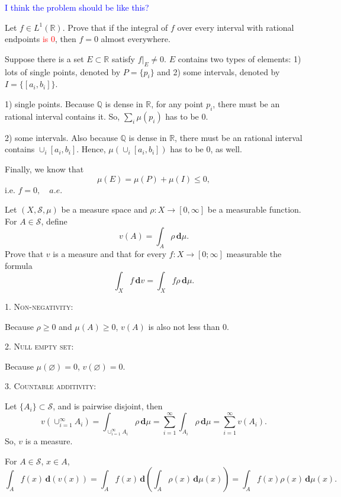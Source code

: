 \documentclass[12pt]{article}
\newenvironment{exercise}[1]{\begin{tcolorbox}[colback=black!15, colframe=black!80, breakable, title=#1]}{\end{tcolorbox}}
\newenvironment{solution}{\begin{tcolorbox}[colback=white, colframe=black!50, breakable, title=Solution. ]\setlength{\parskip}{0.8em}}{\end{tcolorbox}}
\newcommand{\der}{\,\mathbf{d}}
\begin{document}
    \begin{solution}
        \textcolor{blue}{I think the problem should be like this? }
        
        Let $f \in L^1(\mathbb{R})$. Prove that if the integral of $f$ over every interval with rational endpoints \textcolor{red}{is $0$}, then $f = 0$ almost everywhere. 
        
        Suppose there is a set $E\subset \mathbb{R}$ satisfy $f|_E\not=0$. $E$ contains two types of elements: 1) lots of single points, denoted by $P=\{p_i\}$ and 2) some intervals, denoted by $I=\{[a_i,b_i]\}$. 

        1) single points. Because $\mathbb{Q}$ is dense in $\mathbb{R}$, for any point $p_i$, there must be an rational interval contains it. So, $\sum_i\mu(p_i)$ has to be $0$. 

        2) some intervals. Also because $\mathbb{Q}$ is dense in $\mathbb{R}$, there must be an rational interval contains $\cup_i[a_i,b_i]$. Hence, $\mu(\cup_i[a_i,b_i])$ has to be $0$, as well. 

        Finally, we know that \[\mu(E)=\mu(P)+\mu(I)\leqslant0, \]
        i.e. $f=0,\quad a.e$. 
    \end{solution}

    \begin{exercise}{12}
        Let $(X, \mathscr{S}, \mu)$ be a measure space and $\rho : X \to [0, \infty]$ be a measurable function. For $A \in \mathscr{S}$, define
        \[
            v(A)=\int_A\rho\der \mu. 
        \]
        Prove that $v$ is a measure and that for every $f: X\to [0;\infty]$ measurable the formula
        \[
            \int_Xf\der v=\int_Xf\rho\der\mu. 
        \]
    \end{exercise}

    \begin{solution}
        \textsc{1. Non-negativity: }

        Because $\rho\geqslant 0$ and $\mu(A)\geqslant 0$, $v(A)$ is also not less than $0$. 

        \textsc{2. Null empty set: }

        Because $\mu(\varnothing)=0$, $v(\varnothing)=0$. 

        \textsc{3. Countable additivity: }

        Let $\{A_i\}\subset \mathscr{S}$, and is pairwise disjoint, then
        \[
            v(\cup_{i=1}^\infty A_i)=\int_{\cup_{i=1}^\infty A_i}\rho\der \mu=\sum_{i=1}^\infty\int_{A_i}\rho\der \mu=\sum_{i=1}^\infty v(A_i). 
        \]
        So, $v$ is a measure. 

        For $A\in\mathscr{S}$, $x\in A$, 
        \[
            \int_Af(x)\der(v(x))=\int_Af(x)\der(\int_A\rho(x)\der \mu(x))=\int_Af(x)\rho(x)\der \mu(x). 
        \]
    \end{solution}

\end{document}
